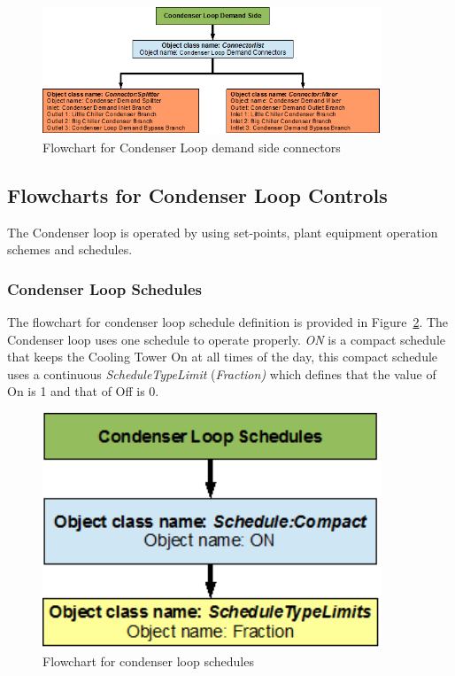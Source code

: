 \begin{figure}[hbtp] %
\centering
\includegraphics[width=0.9\textwidth, height=0.9\textheight, keepaspectratio=true]{media/image124.png}
\caption{Flowchart for Condenser Loop demand side connectors \protect \label{fig:flowchart-for-condenser-loop-demand-side-connectors-002}}
\end{figure}

\subsection{Flowcharts for Condenser Loop Controls}\label{flowcharts-for-condenser-loop-controls-000}

The Condenser loop is operated by using set-points, plant equipment operation schemes and schedules.

\subsubsection{Condenser Loop Schedules}\label{condenser-loop-schedules-000}

The flowchart for condenser loop schedule definition is provided in Figure~\ref{fig:flowchart-for-condenser-loop-schedules-002}. The Condenser loop uses one schedule to operate properly. \emph{ON} is a compact schedule that keeps the Cooling Tower On at all times of the day, this compact schedule uses a continuous \emph{ScheduleTypeLimit} (\emph{Fraction)} which defines that the value of On is 1 and that of Off is 0.

\begin{figure}[hbtp] %
\centering
\includegraphics[width=0.9\textwidth, height=0.9\textheight, keepaspectratio=true]{media/image125.png}
\caption{Flowchart for condenser loop schedules \protect \label{fig:flowchart-for-condenser-loop-schedules-002}}
\end{figure}

